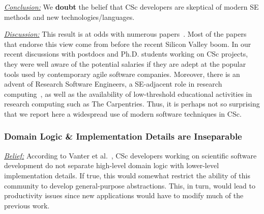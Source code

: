 \documentclass[conference,10pt]{IEEEtran}
\newenvironment{RQ}{\vspace{1mm}\begin{tcolorbox}[enhanced,width=3.4in,size=fbox,colback=red!5!white,drop shadow southeast,sharp corners]}{\end{tcolorbox}}
\begin{document}
\begin{RQ} 
\textit{\underline{Conclusion:}} We \textbf{doubt} the belief that 
CSc developers are skeptical of modern SE methods and new technologies/languages.
\end{RQ}

\noindent \textit{\underline{Discussion:}} This result is at odds
with numerous papers~\cite{basili08_hpc, carver07_environment, Prabhu11_cssurvey, kendall05_C, ragan14_pythoncs}. 
Most of the papers that endorse this view come from before the recent Silicon Valley boom. In our recent discussions with postdocs and Ph.D. students working on CSc projects,
they were well aware of the potential salaries if they are adept at the popular tools used by contemporary agile software companies. Moreover, there is an advent of Research Software Engineers, a SE-adjacent role in research computing~\cite{RSEs_roles}, as well as the availability of low-threshold educational activities in
research computing such as The Carpentries. Thus, it is perhaps not so surprising that we report here a widespread use of modern software techniques in CSc. \\
 


\subsubsection{Domain Logic \& Implementation Details are Inseparable}\label{tion:separation}




\noindent \textit{\underline{Belief:}} 
According to Vanter et al.~\cite{faulk09_secs},
CSc developers working on scientific software development do not separate high-level domain logic with
lower-level implementation details. If true, this would somewhat restrict the ability
of this community to develop general-purpose abstractions. This, in turn, would lead
to productivity issues since new applications would have to modify much of the previous
work. 
\end{document}
